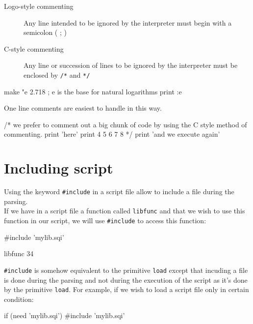 \begin{description}
\item[Logo-style commenting] Any line intended to be ignored by the interpreter must begin with a semicolon ( ; ) 
\item[C-style commenting] Any line or succession of lines to be ignored by the interpreter must be enclosed by \verb+/*+ and \verb+*/+
\end{description} 

\begin{verbatimtab}  
make "e 2.718 
; e is the base for natural logarithms 
print :e
\end{verbatimtab}
 
One line comments are easiest to handle in this way.\\
 
\begin{verbatimtab} 
/* we prefer to comment out a big chunk of code
by using the C style method of commenting.
print 'here'
print 4 5 6 7 8
*/
print 'and we execute again'
\end{verbatimtab}

\section{Including script}

Using the keyword {\tt \verb+#+include} in a script file allow to include a file during the parsing.\\

If we have in a script file a function called {\tt libfunc} and that we wish to use this function in our script, we will use {\tt \verb+#+include} to access this function: 
 
\begin{verbatimtab} 
#include 'mylib.sqi'

libfunc 34
\end{verbatimtab} 

{\tt \verb+#+include} is somehow equivalent to the primitive {\tt load} except that incuding a file is done during the parsing and not during the execution of the script as it's done by the primitive {\tt load}. For example, if we wish to load a script file only in certain condition:

\begin{verbatimtab}
if (need 'mylib.sqi') { 
	#include 'mylib.sqi'
}
\end{verbatimtab}

